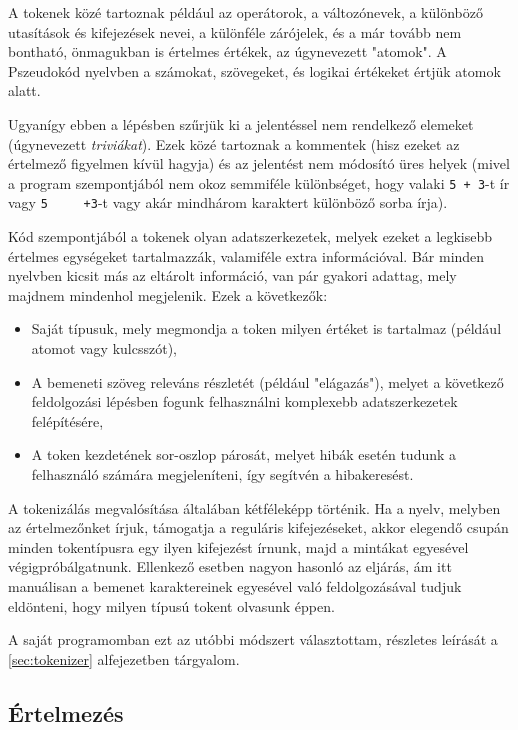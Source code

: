 A tokenek közé tartoznak például az operátorok, a változónevek, a különböző utasítások és kifejezések nevei, a különféle zárójelek, és a már tovább nem bontható, önmagukban is értelmes értékek, az úgynevezett "atomok". A Pszeudokód nyelvben a számokat, szövegeket, és logikai értékeket értjük atomok alatt.

Ugyanígy ebben a lépésben szűrjük ki a jelentéssel nem rendelkező elemeket (úgynevezett \textit{triviákat}). Ezek közé tartoznak a kommentek (hisz ezeket az értelmező figyelmen kívül hagyja) és az jelentést nem módosító üres helyek (mivel a program szempontjából nem okoz semmiféle különbséget, hogy valaki \verb|5 + 3|-t ír vagy \verb|5     +3|-t vagy akár mindhárom karaktert különböző sorba írja).

Kód szempontjából a tokenek olyan adatszerkezetek, melyek ezeket a legkisebb értelmes egységeket tartalmazzák, valamiféle extra információval. Bár minden nyelvben kicsit más az eltárolt információ, van pár gyakori adattag, mely majdnem mindenhol megjelenik. Ezek a következők:

\begin{itemize}
    \item Saját típusuk, mely megmondja a token milyen értéket is tartalmaz (például atomot vagy kulcsszót),
    \item A bemeneti szöveg releváns részletét (például "elágazás"), melyet a következő feldolgozási lépésben fogunk felhasználni komplexebb adatszerkezetek felépítésére,
    \item A token kezdetének sor-oszlop párosát, melyet hibák esetén tudunk a felhasználó számára megjeleníteni, így segítvén a hibakeresést.
\end{itemize}

A tokenizálás megvalósítása általában kétféleképp történik. Ha a nyelv, melyben az értelmezőnket írjuk, támogatja a reguláris kifejezéseket, akkor elegendő csupán minden tokentípusra egy ilyen kifejezést írnunk, majd a mintákat egyesével végigpróbálgatnunk. Ellenkező esetben nagyon hasonló az eljárás, ám itt manuálisan a bemenet karaktereinek egyesével való feldolgozásával tudjuk eldönteni, hogy milyen típusú tokent olvasunk éppen.

A saját programomban ezt az utóbbi módszert választottam, részletes leírását a \ref{sec:tokenizer} alfejezetben tárgyalom.

\subsection{Értelmezés}

